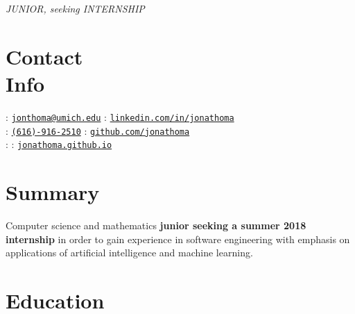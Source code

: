 \documentclass[margin,line]{resume}
\begin{document}
 {\hfill\textsl{\large JUNIOR, seeking INTERNSHIP}}
      
\begin{resume}
	\vspace{-3.5mm}
	\section{\mysidestyle Contact\\Info}
	\noindent \faEnvelope : \href{mailto:jonthoma@umich.edu}{\nolinkurl{jonthoma@umich.edu}} \hfill \faLinkedinSign : \href{https://linkedin.com/in/jonathoma}{\nolinkurl{linkedin.com/in/jonathoma}}\\
	\noindent \faPhone : \href{tel:+1-616-916-2510}{\nolinkurl{(616)-916-2510}} \hfill \faGithub : \href{https://github.com/jonathoma}{\nolinkurl{github.com/jonathoma}} \\ 
	\faHome : \rmfamily \hfill  \faUser : \href{https://jonathoma.github.io}{\nolinkurl{jonathoma.github.io}} \\
	\vspace{-2.5mm}
	    
	\sectionbreak
	\vspace{-3.5mm}
	\section{\mysidestyle Summary}
	Computer science and mathematics \textbf{junior seeking a summer 2018 internship} in order to gain experience in software engineering with emphasis on applications of artificial intelligence and machine learning. \vspace{-2.5mm}\\ 
	    
	\sectionbreak
	\vspace{-2.5mm}
	\section{\mysidestyle Education}
	

\end{resume}
\end{document}

